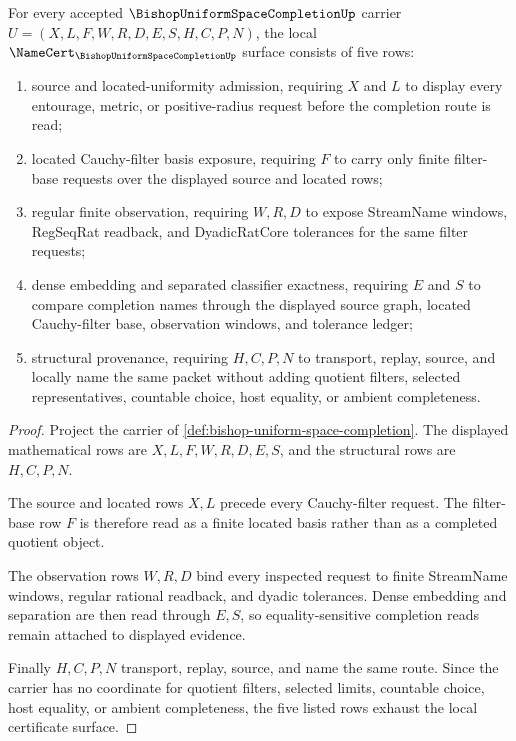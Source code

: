 \begin{theorem}
\label{thm:bishop-uniform-space-completion-namecert-obligations}
For every accepted $\BishopUniformSpaceCompletionUp$ carrier $U=(X,L,F,W,R,D,E,S,H,C,P,N)$, the local $\NameCert_{\BishopUniformSpaceCompletionUp}$ surface consists of five rows:
\begin{enumerate}
\item source and located-uniformity admission, requiring $X$ and $L$ to display every entourage, metric, or positive-radius request before the completion route is read;
\item located Cauchy-filter basis exposure, requiring $F$ to carry only finite filter-base requests over the displayed source and located rows;
\item regular finite observation, requiring $W,R,D$ to expose StreamName windows, RegSeqRat readback, and DyadicRatCore tolerances for the same filter requests;
\item dense embedding and separated classifier exactness, requiring $E$ and $S$ to compare completion names through the displayed source graph, located Cauchy-filter base, observation windows, and tolerance ledger;
\item structural provenance, requiring $H,C,P,N$ to transport, replay, source, and locally name the same packet without adding quotient filters, selected representatives, countable choice, host equality, or ambient completeness.
\end{enumerate}
\end{theorem}
\begin{proof}
Project the carrier of \autoref{def:bishop-uniform-space-completion}. The displayed mathematical rows are $X,L,F,W,R,D,E,S$, and the structural rows are $H,C,P,N$.

The source and located rows $X,L$ precede every Cauchy-filter request. The filter-base row $F$ is therefore read as a finite located basis rather than as a completed quotient object.

The observation rows $W,R,D$ bind every inspected request to finite StreamName windows, regular rational readback, and dyadic tolerances. Dense embedding and separation are then read through $E,S$, so equality-sensitive completion reads remain attached to displayed evidence.

Finally $H,C,P,N$ transport, replay, source, and name the same route. Since the carrier has no coordinate for quotient filters, selected limits, countable choice, host equality, or ambient completeness, the five listed rows exhaust the local certificate surface.
\end{proof}

